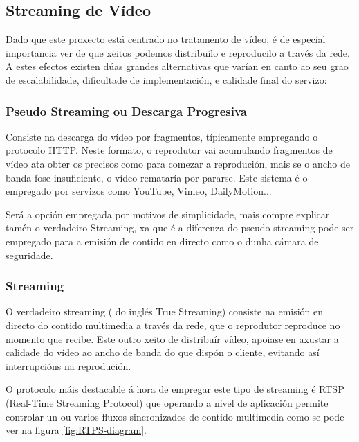     \subsection{Streaming de Vídeo}
        Dado que este proxecto está centrado no tratamento de vídeo, é de especial importancia ver 
        de que xeitos podemos distribuílo e reproducilo a través da rede. A estes efectos existen dúas
        grandes alternativas que varían en canto ao seu grao de escalabilidade, dificultade de 
        implementación, e calidade final do servizo:
        
        \subsubsection{Pseudo Streaming ou Descarga Progresiva}
            Consiste na descarga do vídeo por fragmentos, típicamente empregando o protocolo HTTP. 
            Neste formato, o reprodutor vai acumulando fragmentos de vídeo ata obter os precisos como 
            para comezar a reprodución, mais se o ancho de banda fose insuficiente, o vídeo remataría
            por pararse. Este sistema é o empregado por servizos como YouTube, Vimeo, DailyMotion...
            
            Será a opción empregada por motivos de simplicidade, mais compre explicar tamén o verdadeiro 
            Streaming, xa que é a diferenza do pseudo-streaming pode ser empregado para a emisión de
            contido en directo como o dunha cámara de seguridade.
            
        \subsubsection{Streaming}
        \label{sec:streaming}
            O verdadeiro streaming ( do inglés True Streaming) consiste na emisión en directo do 
            contido multimedia a través da rede, que o reprodutor reproduce no momento que recibe.
            Este outro xeito de distribuír vídeo, apoiase en axustar a calidade do vídeo ao ancho de
            banda do que dispón o cliente, evitando así interrupcións na reprodución.
            
            O protocolo máis destacable á hora de empregar este tipo de streaming é RTSP (Real-Time
            Streaming Protocol) que operando a nivel de aplicación permite controlar un ou varios fluxos 
            sincronizados de contido multimedia como se pode ver na figura \ref{fig:RTPS-diagram}.
            
